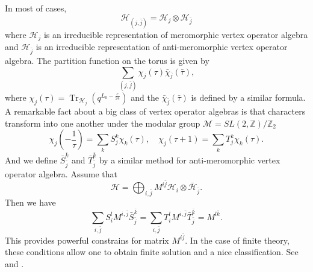 \documentclass[10pt,reqno,draft]{article}
\numberwithin{equation}{section}
\numberwithin{figure}{section}
\numberwithin{table}{section}
\theoremstyle{plain}
\theoremstyle{definition}
\theoremstyle{remark}
\begin{document}
	In most of cases, 
	\begin{equation}
	  \mathcal{H}_{(j,\bar{j})}=\mathcal{H}_{j}\otimes\mathcal{H}_{\bar{j}}
	\end{equation}
	where \(\mathcal{H}_{j}\) is an irreducible representation of meromorphic vertex operator algebra and \(\mathcal{H}_{\bar{j}}\) is an irreducible representation of anti-meromorphic vertex operator algebra. The partition function on the torus is given by 
	\begin{equation}
	  \sum_{(j,\bar{j})} \chi_{j}(\tau)\bar{\chi}_{\bar{j}}(\bar{\tau}),
	\end{equation}
	where \(\chi_{j}(\tau)=\operatorname{Tr}_{\mathcal{H}_{j}}(q^{L_0-\frac{c}{24}}) \) and the \(\bar{\chi}_{\bar{j}}(\bar{\tau})\) is defined by a similar formula. A remarkable fact about a big class of vertex operator algebras is that characters transform into one another under the modular group \(\mathcal{M}=SL(2,\mathbb{Z})/\mathbb{Z}_{2}\)
	\begin{equation}
		\chi_{j} \left( -\frac{1}{\tau} \right) =\sum_{k} S_{j}^{k}\chi_{k}(\tau),\quad \chi_{j}(\tau+1)=\sum_{k} T_{j}^{k}\chi_{k}(\tau).
	\end{equation}
	And we define \(\bar{S}_{\bar{j}}^{\bar{k}}\) and \(\bar{T}_{\bar{j}}^{\bar{k}}\) by a similar method for anti-meromorphic vertex operator algebra. Assume that 
	\begin{equation}
	  \mathcal{H}=\bigoplus_{i,\bar{j}}M^{i\bar{j}}\mathcal{H}_{i}\otimes\bar{\mathcal{H}}_{\bar{j}}.
	\end{equation}
	Then we have 
	\begin{equation}
	  \sum_{i,\bar{j}} S_{i}^{l}M^{i,\bar{j}}\bar{S}_{\bar{j}}^{\bar{k}}=\sum_{i,\bar{j}} T_{i}^{l}M^{i,\bar{j}}\bar{T}_{\bar{j}}^{\bar{k}}=M^{l\bar{k}}.
	\end{equation}
	This provides powerful constrains for matrix \(M^{i\bar{j}}\). In the case of finite theory, these conditions allow one to obtain finite solution and a nice classification. See \cite{cappelliModularInvariantPartition1987,cappelliADEClassificationMinimal1987,gannonCappelliItzyksonZuberADEClassification2000} and \cite{gannonClassificationSUModular,gannonModularInvariantsMinimal1997}.
\end{document}
